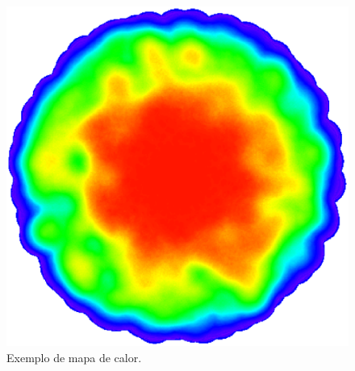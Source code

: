   \begin{figure}[!htbp]
  \begin{center}
  \includegraphics[width=.5\textwidth]{figuras/heatmap.eps}
  \caption{\label{fig:heatmap}Exemplo de mapa de calor.}
  \end{center}
  \end{figure}
